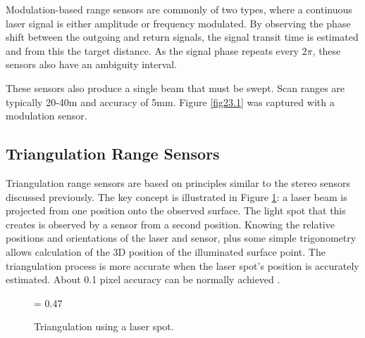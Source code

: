 \documentclass[twocolumn,oneside]{book}
\begin{document}
 Modulation-based range sensors are commonly of two types, where a
continuous laser signal is either amplitude or frequency modulated.
By observing the phase shift between the outgoing and return signals,
the signal transit time is estimated and from this the target distance.
As the signal phase repeats every $2 \pi$, these sensors also have
an ambiguity interval.


These sensors also produce a single beam that must be swept.
Scan ranges are typically 20-40m and accuracy of 5mm.
Figure \ref{fig23.1} was captured with a modulation sensor.

\subsection{Triangulation Range Sensors}


 Triangulation range sensors \cite{LeMoigne} are based on principles similar to the
stereo sensors discussed previously.
The key concept is illustrated in Figure \ref{lasertri}: a laser beam is projected
from one position onto the observed surface.
The light spot that this creates is observed by a sensor from a second
position.
Knowing the relative positions and orientations of the laser and sensor,
plus some simple trigonometry allows calculation of the 3D position
of the illuminated surface point.
The triangulation process is more accurate when the laser spot's
position is accurately estimated. About 0.1 pixel accuracy can be
normally achieved \cite{naidu}.
\begin{figure}[htb]
{\epsfxsize = 0.47\textwidth {}}
\caption{Triangulation using a laser spot.
\label{lasertri}}
\end{figure}
\end{document}
